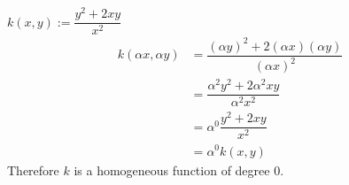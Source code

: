 $k(x,y) := \dfrac{y^2 + 2xy}{x^2}$
\begin{align*}
    k(\alpha x, \alpha y) &= \dfrac{(\alpha y)^2 + 2(\alpha x) (\alpha y)}{(\alpha x)^2}  \\
    &= \dfrac{\alpha^2 y^2 + 2\alpha^2 xy}{\alpha^2 x^2} \\
    &= \alpha^0 \dfrac{y^2 + 2xy}{x^2} \\
    &= \alpha^0 k(x,y)
\end{align*}
Therefore $k$ is a homogeneous function of degree 0.
